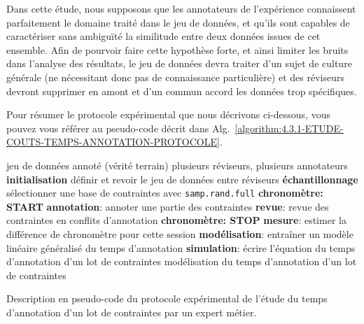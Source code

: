			\begin{leftBarWarning}
				Dans cette étude, nous supposons que les annotateurs de l'expérience connaissent parfaitement le domaine traité dans le jeu de données, et qu'ils sont capables de caractériser sans ambiguïté la similitude entre deux données issues de cet ensemble.
				Afin de pourvoir faire cette hypothèse forte, et ainsi limiter les bruits dans l'analyse des résultats, le jeu de données devra traiter d'un sujet de culture générale (ne nécessitant donc pas de connaissance particulière) et des réviseurs devront supprimer en amont et d'un commun accord les données trop spécifiques.
			\end{leftBarWarning}
			
			Pour résumer le protocole expérimental que nous décrivons ci-dessous, vous pouvez vous référer au pseudo-code décrit dans Alg.~\ref{algorithm:4.3.1-ETUDE-COUTS-TEMPS-ANNOTATION-PROTOCOLE}.
			\begin{algorithm}[!htb]
				\begin{algorithmic}[1]
					\Require jeu de données annoté (vérité terrain)
					\Require plusieurs réviseurs, plusieurs annotateurs
					\State \textbf{initialisation} définir et revoir le jeu de données entre réviseurs
					\State \textbf{échantillonnage} sélectionner une base de contraintes avec \texttt{samp.rand.full}
							\State \textbf{chronomètre: START}
							\State \textbf{annotation}: annoter une partie des contraintes
							\State \textbf{revue}: revue des contraintes en conflits d'annotation
							\State \textbf{chronomètre: STOP}
							\State \textbf{mesure}: estimer la différence de chronomètre pour cette session
						\EndWhile
					\EndFor
					\State \textbf{modélisation}: entraîner un modèle linéaire généralisé du temps d'annotation
					\State \textbf{simulation}: écrire l'équation du temps d'annotation d'un lot de contraintes
					\Ensure modélisation du temps d'annotation d'un lot de contraintes
				\end{algorithmic}
				\caption{Description en pseudo-code du protocole expérimental de l'étude du temps d'annotation d'un lot de contraintes par un expert métier.}
				\label{algorithm:4.3.1-ETUDE-COUTS-TEMPS-ANNOTATION-PROTOCOLE}
			\end{algorithm}
			
